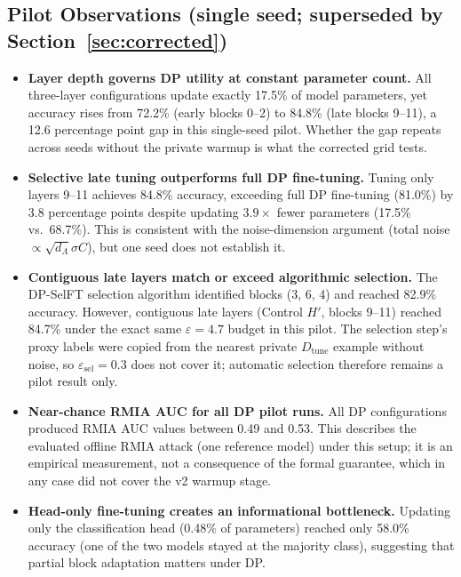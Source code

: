 \documentclass[11pt,a4paper]{article}
\begin{document}
\subsection{Pilot Observations (single seed; superseded by Section~\ref{sec:corrected})}

\begin{itemize}
  \item \textbf{Layer depth governs DP utility at constant parameter count.} All three-layer
        configurations update exactly 17.5\% of model parameters, yet accuracy rises from 72.2\%
        (early blocks 0--2) to 84.8\% (late blocks 9--11), a 12.6 percentage point gap in this
        single-seed pilot. Whether the gap repeats across seeds without the private warmup is what
        the corrected grid tests.
  \item \textbf{Selective late tuning outperforms full DP fine-tuning.} Tuning only layers 9--11
        achieves 84.8\% accuracy, exceeding full DP fine-tuning (81.0\%) by 3.8 percentage points
        despite updating $3.9\times$ fewer parameters (17.5\% vs.\ 68.7\%). This is consistent with
        the noise-dimension argument (total noise $\propto \sqrt{d_\Lambda}\sigma C$), but one seed does
        not establish it.
  \item \textbf{Contiguous late layers match or exceed algorithmic selection.} The DP-SelFT
        selection algorithm identified blocks (3, 6, 4) and reached 82.9\% accuracy. However,
        contiguous late layers (Control $H'$, blocks 9--11) reached 84.7\% under the exact same
        $\varepsilon = 4.7$ budget in this pilot. The selection step's proxy labels were copied from
        the nearest private $D_{\text{tune}}$ example without noise, so $\varepsilon_{\text{sel}} = 0.3$
        does not cover it; automatic selection therefore remains a pilot result only.
  \item \textbf{Near-chance RMIA AUC for all DP pilot runs.} All DP configurations produced RMIA
        AUC values between 0.49 and 0.53. This describes the evaluated offline RMIA attack (one
        reference model) under this setup; it is an empirical measurement, not a consequence of the
        formal guarantee, which in any case did not cover the v2 warmup stage.
  \item \textbf{Head-only fine-tuning creates an informational bottleneck.} Updating only the
        classification head (0.48\% of parameters) reached only 58.0\% accuracy (one of the two models
        stayed at the majority class), suggesting that partial block adaptation matters under DP.
\end{itemize}
\end{document}
